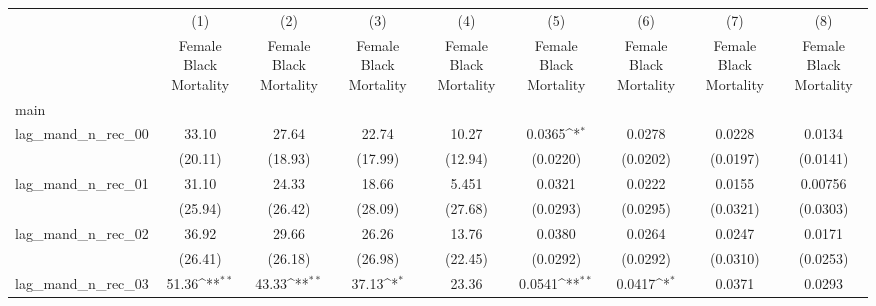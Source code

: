 {
\def\sym#1{\ifmmode^{#1}\else\(^{#1}\)\fi}
\begin{longtable}{l*{8}{c}}
\hline\hline\endfirsthead\hline\endhead\hline\endfoot\endlastfoot
                    &\multicolumn{1}{c}{(1)}&\multicolumn{1}{c}{(2)}&\multicolumn{1}{c}{(3)}&\multicolumn{1}{c}{(4)}&\multicolumn{1}{c}{(5)}&\multicolumn{1}{c}{(6)}&\multicolumn{1}{c}{(7)}&\multicolumn{1}{c}{(8)}\\
                    &\multicolumn{1}{c}{Female Black Mortality}&\multicolumn{1}{c}{Female Black Mortality}&\multicolumn{1}{c}{Female Black Mortality}&\multicolumn{1}{c}{Female Black Mortality}&\multicolumn{1}{c}{Female Black Mortality}&\multicolumn{1}{c}{Female Black Mortality}&\multicolumn{1}{c}{Female Black Mortality}&\multicolumn{1}{c}{Female Black Mortality}\\
\hline
main                &                     &                     &                     &                     &                     &                     &                     &                     \\
lag\_mand\_n\_rec\_00   &       33.10         &       27.64         &       22.74         &       10.27         &      0.0365\sym{*}  &      0.0278         &      0.0228         &      0.0134         \\
                    &     (20.11)         &     (18.93)         &     (17.99)         &     (12.94)         &    (0.0220)         &    (0.0202)         &    (0.0197)         &    (0.0141)         \\
[1em]
lag\_mand\_n\_rec\_01   &       31.10         &       24.33         &       18.66         &       5.451         &      0.0321         &      0.0222         &      0.0155         &     0.00756         \\
                    &     (25.94)         &     (26.42)         &     (28.09)         &     (27.68)         &    (0.0293)         &    (0.0295)         &    (0.0321)         &    (0.0303)         \\
[1em]
lag\_mand\_n\_rec\_02   &       36.92         &       29.66         &       26.26         &       13.76         &      0.0380         &      0.0264         &      0.0247         &      0.0171         \\
                    &     (26.41)         &     (26.18)         &     (26.98)         &     (22.45)         &    (0.0292)         &    (0.0292)         &    (0.0310)         &    (0.0253)         \\
[1em]
lag\_mand\_n\_rec\_03   &       51.36\sym{**} &       43.33\sym{**} &       37.13\sym{*}  &       23.36         &      0.0541\sym{**} &      0.0417\sym{*}  &      0.0371         &      0.0293         \\

\end{longtable}}
